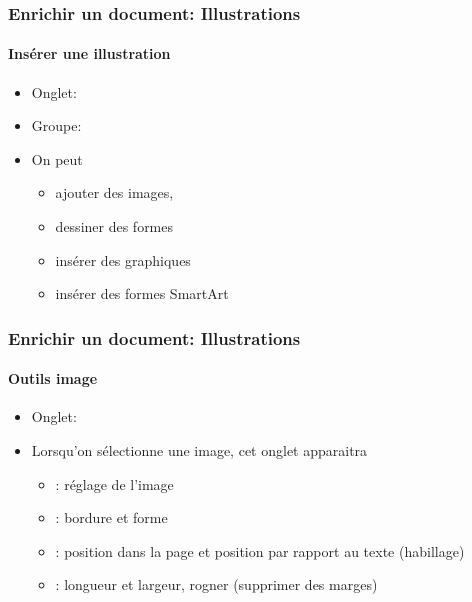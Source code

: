 \documentclass[xcolor=table]{beamer}
\begin{document}
\begin{frame}[t]
\frametitle{Enrichir un document: Illustrations}
\framesubtitle{Insérer une illustration}

\begin{minipage}{0.43\textwidth}
\begin{itemize}
	\item Onglet: 
	\item Groupe: 
	\item On peut
	\begin{itemize}
		\item ajouter des images,
		\item dessiner des formes
		\item insérer des graphiques
		\item insérer des formes SmartArt
	\end{itemize}
\end{itemize}
\end{minipage}
\begin{minipage}{0.28\textwidth}
	
	
\end{minipage}
\begin{minipage}{0.27\textwidth}	
\end{minipage}

\end{frame}


\begin{frame}[t]
\frametitle{Enrichir un document: Illustrations}
\framesubtitle{Outils image}


\begin{minipage}{0.56\textwidth}
\begin{itemize}
	\item Onglet: 
	\item Lorsqu'on sélectionne une image, cet onglet apparaitra
	\begin{itemize}
		\item {} : réglage de l'image
		\item {} : bordure et forme
		\item {} : position dans la page et position par rapport au texte (habillage)
		\item {} : longueur et largeur, rogner (supprimer des marges)
	\end{itemize}
\end{itemize}
\end{minipage}
\begin{minipage}{0.22\textwidth}
\end{minipage}
\begin{minipage}{0.20\textwidth}	
\end{minipage}

\end{frame}
\end{document}
